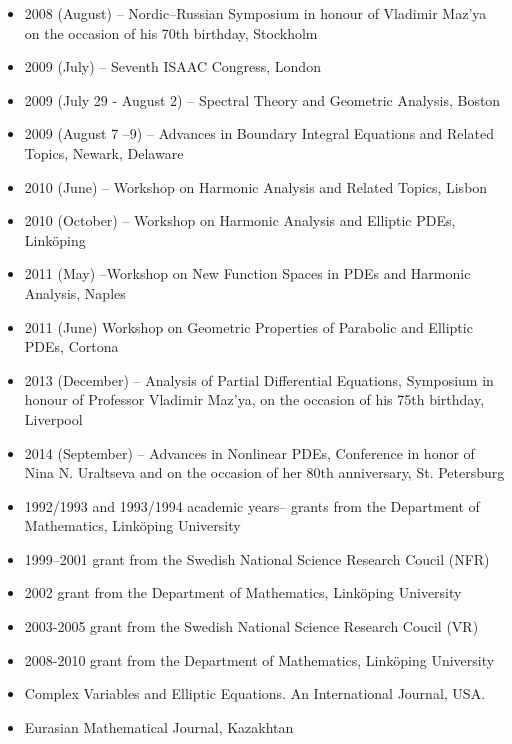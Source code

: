 \documentclass{article}
\begin{document}
\begin{itemize}
        \item 2008 (August) -- Nordic--Russian Symposium in honour of Vladimir Maz'ya on the occasion of his 70th birthday, Stockholm
         \item 2009 (July) -- Seventh ISAAC Congress, London
       \item 2009 (July 29 - August 2)  -- Spectral Theory and Geometric Analysis, Boston
       \item 2009 (August 7 --9) -- Advances in Boundary Integral Equations and Related Topics, Newark, Delaware
       \item 2010 (June) -- Workshop on Harmonic Analysis and Related Topics, Lisbon
       \item 2010 (October) -- Workshop on Harmonic Analysis and Elliptic PDEs, Link\"oping
        \item 2011 (May) --Workshop on New Function Spaces in PDEs and Harmonic Analysis, Naples
        \item 2011 (June) Workshop on Geometric Properties of Parabolic and Elliptic PDEs, Cortona
        \item 2013 (December) -- Analysis of Partial Differential Equations, Symposium in honour of Professor Vladimir Maz'ya, on the occasion of his 75th birthday, Liverpool
        \item 2014 (September) -- Advances in Nonlinear PDEs, Conference in honor of Nina N. Uraltseva and on the occasion of her 80th anniversary, St. Petersburg
\end{itemize}

\bigskip

    \begin{itemize}
         \item 1992/1993 and 1993/1994 academic years-- grants from
the Department of Mathematics, Link\"oping University
          \item 1999--2001 grant from the Swedish National Science
Research Coucil (NFR)
         \item 2002 grant from the Department of Mathematics,
Link\"oping University
         \item 2003-2005 grant from the Swedish National Science
Research Coucil (VR)
                 \item 2008-2010 grant from the Department of Mathematics,
Link\"oping University
     \end{itemize}


   \begin{itemize}
     \item Complex Variables and Elliptic Equations. An International Journal, USA.
     \item Eurasian Mathematical Journal, Kazakhtan
     \end{itemize}
\end{document}
